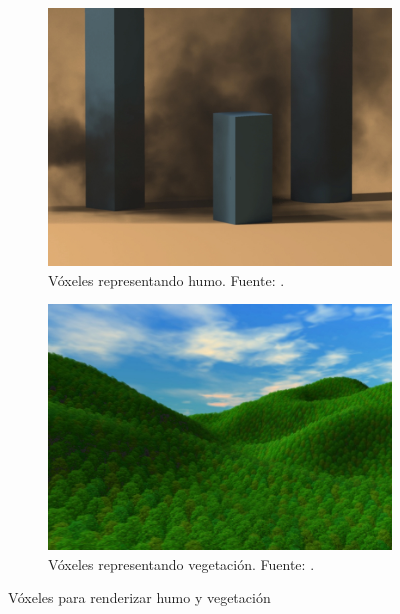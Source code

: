 \begin{figure}
    \begin{center}
        \begin{subfigure}{.49\textwidth}
            \centering
            \includegraphics[width=\textwidth]{voxel-smoke.png}
            \caption{Vóxeles representando humo. Fuente: \cite{voxel-smoke}.}
        \end{subfigure}
        \begin{subfigure}{.49\textwidth}
            \centering
            \includegraphics[width=\textwidth]{voxels-for-trees.png}
            \caption{Vóxeles representando vegetación. Fuente: \cite{voxels-for-trees}.}
        \end{subfigure}
    \end{center}
    \caption{Vóxeles para renderizar humo y vegetación}
    \label{fig:voxels_for_rendering}
\end{figure} %

